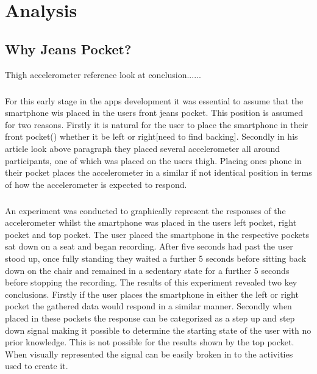 \chapter{Analysis} %
\label{cha:chapter_analysis}



\section{Why Jeans Pocket?} %
\label{sec:section_pocket}
Thigh accelerometer reference look at conclusion......
\paragraph{}
For this early stage in the apps development it was essential to assume that the smartphone wis placed in the users front jeans pocket. This position is assumed for two reasons. Firstly it is natural for the user to place the smartphone in their front pocket() whether it be left or right[need to find backing]. Secondly in his article look above paragraph they placed several accelerometer all around participants, one of which was placed on the users thigh. Placing ones phone in their pocket places the accelerometer in a similar if not identical position in terms of how the accelerometer is expected to respond. 
\paragraph{}
An experiment was conducted to graphically represent the responses of the accelerometer whilst the smartphone was placed in the users left pocket, right pocket and top pocket. The user placed the smartphone in the respective pockets sat down on a seat and began recording. After five seconds had past the user stood up, once fully standing they waited a further 5 seconds before sitting back down on the chair and remained in a sedentary state for a further 5 seconds before stopping the recording. The results of this experiment revealed two key conclusions. Firstly if the user places the smartphone in either the left or right pocket the gathered data would respond in a similar manner. Secondly when placed in these pockets the response can be categorized as a step up and step down signal making it possible to determine the starting state of the user with no prior knowledge. This is not possible for the results shown by the top pocket. When visually represented the signal can be easily broken in to the activities used to create it. 

